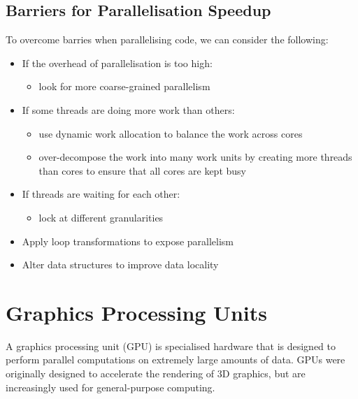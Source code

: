 \documentclass{article}
\begin{document}
\subsection{Barriers for Parallelisation Speedup}
To overcome barries when parallelising code, we can consider the
following:
\begin{itemize}
    \item If the overhead of parallelisation is too high:
          \begin{itemize}
              \item look for more coarse-grained parallelism
          \end{itemize}
    \item If some threads are doing more work than others:
          \begin{itemize}
              \item use dynamic work allocation to balance the work
                    across cores
              \item over-decompose the work into many work units by
                    creating more threads than cores to ensure that all
                    cores are kept busy
          \end{itemize}
    \item If threads are waiting for each other:
          \begin{itemize}
              \item lock at different granularities
          \end{itemize}
    \item Apply loop transformations to expose parallelism
    \item Alter data structures to improve data locality
\end{itemize}
\section{Graphics Processing Units}
A graphics processing unit (GPU) is specialised hardware that is
designed to perform parallel computations on extremely large amounts of
data. GPUs were originally designed to accelerate the rendering of 3D
graphics, but are increasingly used for general-purpose computing.
\end{document}
